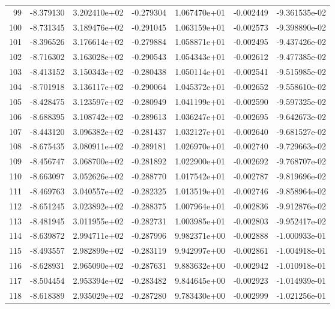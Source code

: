 \begin{tabular}{rrrrrrr}
  99 &  -8.379130 &  3.202410e+02 & -0.279304 &  1.067470e+01 &  -0.002449 & -9.361535e-02 \\
 100 &  -8.731345 &  3.189476e+02 & -0.291045 &  1.063159e+01 &  -0.002573 & -9.398890e-02 \\
 101 &  -8.396526 &  3.176614e+02 & -0.279884 &  1.058871e+01 &  -0.002495 & -9.437426e-02 \\
 102 &  -8.716302 &  3.163028e+02 & -0.290543 &  1.054343e+01 &  -0.002612 & -9.477385e-02 \\
 103 &  -8.413152 &  3.150343e+02 & -0.280438 &  1.050114e+01 &  -0.002541 & -9.515985e-02 \\
 104 &  -8.701918 &  3.136117e+02 & -0.290064 &  1.045372e+01 &  -0.002652 & -9.558610e-02 \\
 105 &  -8.428475 &  3.123597e+02 & -0.280949 &  1.041199e+01 &  -0.002590 & -9.597325e-02 \\
 106 &  -8.688395 &  3.108742e+02 & -0.289613 &  1.036247e+01 &  -0.002695 & -9.642673e-02 \\
 107 &  -8.443120 &  3.096382e+02 & -0.281437 &  1.032127e+01 &  -0.002640 & -9.681527e-02 \\
 108 &  -8.675435 &  3.080911e+02 & -0.289181 &  1.026970e+01 &  -0.002740 & -9.729663e-02 \\
 109 &  -8.456747 &  3.068700e+02 & -0.281892 &  1.022900e+01 &  -0.002692 & -9.768707e-02 \\
 110 &  -8.663097 &  3.052626e+02 & -0.288770 &  1.017542e+01 &  -0.002787 & -9.819696e-02 \\
 111 &  -8.469763 &  3.040557e+02 & -0.282325 &  1.013519e+01 &  -0.002746 & -9.858964e-02 \\
 112 &  -8.651245 &  3.023892e+02 & -0.288375 &  1.007964e+01 &  -0.002836 & -9.912876e-02 \\
 113 &  -8.481945 &  3.011955e+02 & -0.282731 &  1.003985e+01 &  -0.002803 & -9.952417e-02 \\
 114 &  -8.639872 &  2.994711e+02 & -0.287996 &  9.982371e+00 &  -0.002888 & -1.000933e-01 \\
 115 &  -8.493557 &  2.982899e+02 & -0.283119 &  9.942997e+00 &  -0.002861 & -1.004918e-01 \\
 116 &  -8.628931 &  2.965090e+02 & -0.287631 &  9.883632e+00 &  -0.002942 & -1.010918e-01 \\
 117 &  -8.504454 &  2.953394e+02 & -0.283482 &  9.844645e+00 &  -0.002923 & -1.014939e-01 \\
 118 &  -8.618389 &  2.935029e+02 & -0.287280 &  9.783430e+00 &  -0.002999 & -1.021256e-01 \\

\end{tabular}
